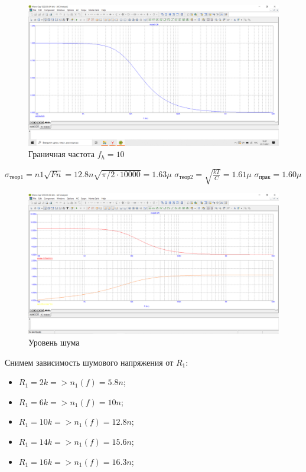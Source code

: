 \documentclass[a4paper, 12pt]{article}%
\begin{document}
\begin{figure}[h!]
    \centering
    \includegraphics[scale = 0.4 \textwidth]{images/mod3_1_1.png}
    \caption{Граничная частота $f_h = 10$}
    \label{fig:m311}
\end{figure}

$\sigma_\text{теор1} = n1\sqrt{Fn} = 12.8n\sqrt{\pi/2 \cdot 10000} = 1.63\mu$
$\sigma_\text{теор2} = \sqrt{\frac{kT}{C}} = 1.61\mu$
$\sigma_\text{прак} = 1.60\mu$

\begin{figure}[h!]
    \centering
    \includegraphics[scale = 0.4 \textwidth]{images/mod3_1_2.png}
    \caption{Уровень шума}
    \label{fig:m312}
\end{figure}

Снимем зависимость шумового напряжения от $R_1$:
\begin{itemize}
    \item $R_1 = 2k => n_1(f) = 5.8n$;
    \item $R_1 = 6k => n_1(f) = 10n$;
    \item $R_1 = 10k => n_1(f) = 12.8n$;
    \item $R_1 = 14k => n_1(f) = 15.6n$;
    \item $R_1 = 16k => n_1(f) = 16.3n$;
\end{itemize}
\end{document}
